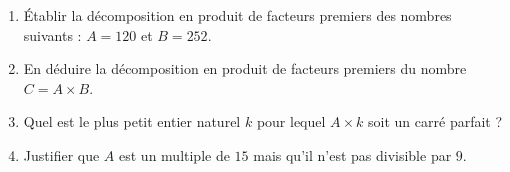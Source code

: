 \documentclass[10pt, a4paper]{article}
\begin{document}
\begin{Application}[][20 min]
\begin{enumerate}[leftmargin=*,itemsep=0.5pt]
    \item Établir la décomposition en produit de facteurs premiers des nombres suivants : $A = 120$ et $B = 252$.
    
    \item En déduire la décomposition en produit de facteurs premiers du nombre $C = A \times B$.
    
    \item Quel est le plus petit entier naturel $k$ pour lequel $A \times k$ soit un carré parfait ?
    
    \item Justifier que $A$ est un multiple de $15$ mais qu'il n'est pas divisible par $9$.
\end{enumerate}
\end{Application}
\end{document}
